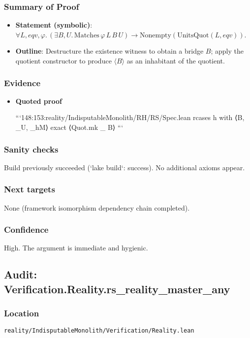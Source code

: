 \documentclass{article}
\newcommand{\FileRef}[1]{\texttt{#1}}
\begin{document}
\subsubsection{Summary of Proof}
\begin{itemize}[leftmargin=*]
  \item \textbf{Statement (symbolic)}: \(\forall L,eqv,φ.\, (\exists B,U.\, \mathrm{Matches}\,φ\,L\,B\,U) \to \mathrm{Nonempty}(\mathrm{UnitsQuot}(L,eqv))\).
  \item \textbf{Outline}: Destructure the existence witness to obtain a bridge \(B\); apply the quotient constructor to produce \(\langle B \rangle\) as an inhabitant of the quotient.
\end{itemize}

\subsubsection{Evidence}
\begin{itemize}[leftmargin=*]
  \item \textbf{Quoted proof}

```148:153:reality/IndisputableMonolith/RH/RS/Spec.lean
rcases h with ⟨B, _U, _hM⟩
exact ⟨Quot.mk _ B⟩
```
\end{itemize}

\subsubsection{Sanity checks}
Build previously succeeded (`lake build`: success). No additional axioms appear.

\subsubsection{Next targets}
None (framework isomorphism dependency chain completed).

\subsubsection{Confidence}
High. The argument is immediate and hygienic.

\subsection{Audit: Verification.Reality.rs\_reality\_master\_any}
\subsubsection{Location}
\FileRef{reality/IndisputableMonolith/Verification/Reality.lean}
\end{document}
